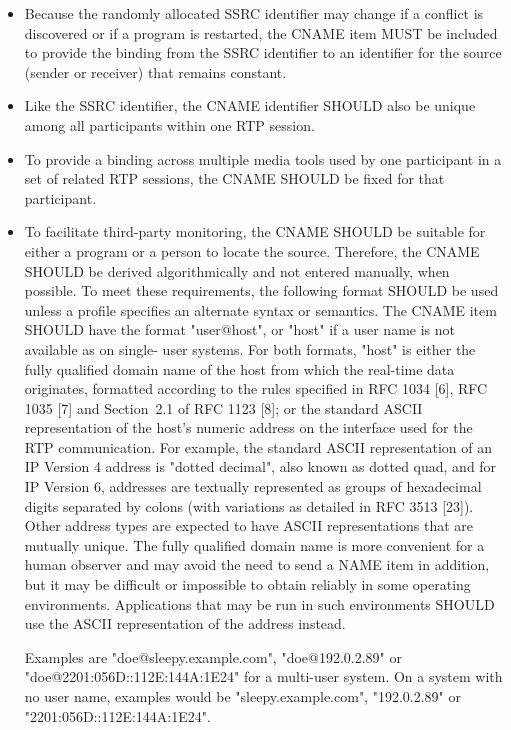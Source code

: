 \documentclass{article}
\begin{document}
\begin{itemize}
\item Because the randomly allocated SSRC identifier may change if a conflict is discovered or if a program is restarted, the CNAME item MUST be included to provide the binding from the SSRC identifier to an identifier for the source (sender or receiver) that remains constant.
\item Like the SSRC identifier, the CNAME identifier SHOULD also be unique among all participants within one RTP session.
\item To provide a binding across multiple media tools used by one participant in a set of related RTP sessions, the CNAME SHOULD be fixed for that participant.
\item To facilitate third-party monitoring, the CNAME SHOULD be suitable for either a program or a person to locate the source.
Therefore, the CNAME SHOULD be derived algorithmically and not entered manually, when possible.  To meet these requirements, the following format SHOULD be used unless a profile specifies an alternate syntax or semantics.  The CNAME item SHOULD have the format "user@host", or "host" if a user name is not available as on single- user systems.  For both formats, "host" is either the fully qualified domain name of the host from which the real-time data originates, formatted according to the rules specified in RFC 1034 [6], RFC 1035 [7] and Section~2.1 of RFC 1123 [8]; or the standard ASCII representation of the host's numeric address on the interface used for the RTP communication.  For example, the standard ASCII representation of an IP Version 4 address is "dotted decimal", also known as dotted quad, and for IP Version 6, addresses are textually represented as groups of hexadecimal digits separated by colons (with variations as detailed in RFC 3513 [23]).  Other address types are expected to have ASCII representations that are mutually unique.  The fully qualified domain name is more convenient for a human observer and may avoid the need to send a NAME item in addition, but it may be difficult or impossible to obtain reliably in some operating environments.  Applications that may be run in such environments SHOULD use the ASCII representation of the address instead.

Examples are "doe@sleepy.example.com", "doe@192.0.2.89" or "doe@2201:056D::112E:144A:1E24" for a multi-user system.  On a system with no user name, examples would be "sleepy.example.com", "192.0.2.89" or "2201:056D::112E:144A:1E24".


\end{itemize}
\end{document}
